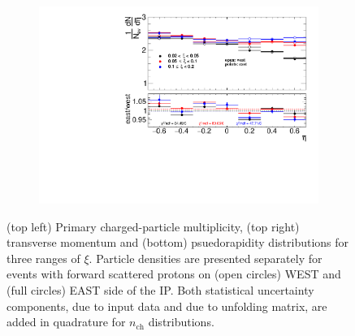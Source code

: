 \begin{figure}[h!]
\begin{subfigure}{.49\textwidth}
		\includegraphics[width=\textwidth,page=1]{chapters/chrgSTAR/img/eastWest/eta_test.pdf}
	\end{subfigure}
	\begin{minipage}{.49\textwidth}
		\caption{(top left) Primary charged-particle multiplicity, (top right) transverse momentum and (bottom) psuedorapidity distributions for three ranges of $\xi$. Particle densities are presented separately for events with forward scattered protons on (open circles) WEST and (full circles) EAST side of the IP. Both statistical uncertainty components, due to input data and due to unfolding matrix, are added in quadrature for $n_\textrm{ch}$ distributions.}
		\label{fig:eastWest_star}
	\end{minipage}
	
\end{figure}